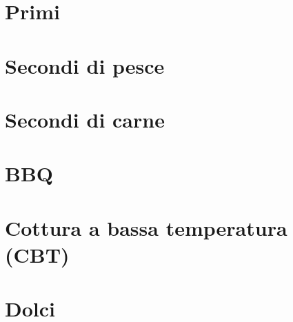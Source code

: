 \documentclass{report}
\begin{document}
\newpage
\chapter{Primi}









\newpage
\chapter{Secondi di pesce}




\newpage
\chapter{Secondi di carne}



\newpage
\chapter{BBQ}







\newpage
\chapter{Cottura a bassa temperatura (CBT)}



%
\newpage
\chapter{Dolci}












\end{document}
